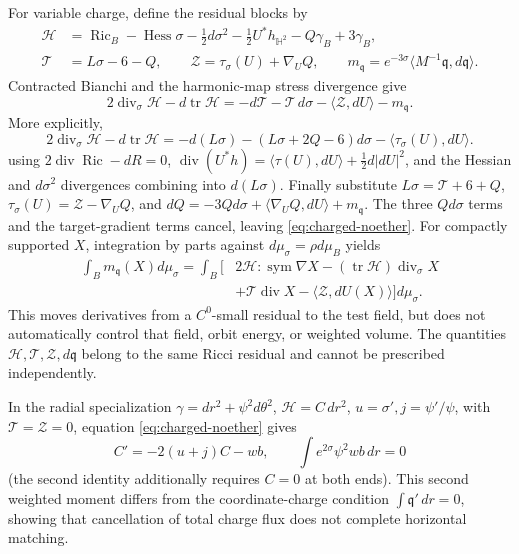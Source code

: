 \documentclass[a4paper,11pt]{article}
\numberwithin{equation}{section}
\theoremstyle{definition}
\newcommand{\Ric}{\operatorname{Ric}}
\newcommand{\tr}{\operatorname{tr}}
\begin{document}
For variable charge, define the residual blocks by
\begin{align}
 \mathscr H&=\Ric_B-\operatorname{Hess}\sigma
       -\tfrac12d\sigma^2-\tfrac12U^*h_{\mathbb H^2}-Q\gamma_B+3\gamma_B,\nonumber\\
 \mathscr T&=L\sigma-6-Q,\qquad
 \mathscr Z=\tau_\sigma(U)+\nabla_UQ,
 \qquad m_{\mathfrak q}=e^{-3\sigma}
          \langle M^{-1}\mathfrak q,d\mathfrak q\rangle.\label{eq:charged-blocks}
\end{align}
Contracted Bianchi and the harmonic-map stress divergence give
\begin{equation}\label{eq:charged-noether}
 2\operatorname{div}_\sigma\mathscr H-d\tr\mathscr H
 =-d\mathscr T-\mathscr T\,d\sigma
 -\langle\mathscr Z,dU\rangle-m_{\mathfrak q}.
\end{equation}
More explicitly,
\[
 2\operatorname{div}_\sigma\mathscr H-d\tr\mathscr H
 =-d(L\sigma)-(L\sigma+2Q-6)d\sigma
                  -\langle\tau_\sigma(U),dU\rangle.
\]
using $2\operatorname{div}\Ric-dR=0$,
$\operatorname{div}(U^*h)=\langle\tau(U),dU\rangle+\tfrac12d|dU|^2$,
and the Hessian and $d\sigma^2$ divergences combining into $d(L\sigma)$.
Finally substitute
$L\sigma=\mathscr T+6+Q$,
$\tau_\sigma(U)=\mathscr Z-\nabla_UQ$, and
$dQ=-3Qd\sigma+\langle\nabla_UQ,dU\rangle+m_{\mathfrak q}$.
The three $Qd\sigma$ terms and the target-gradient terms cancel, leaving \eqref{eq:charged-noether}.
For compactly supported $X$, integration by parts against $d\mu_\sigma=\rho d\mu_B$ yields
\begin{align}
 \int_Bm_{\mathfrak q}(X)d\mu_\sigma
 =\int_B\bigl[&2\mathscr H:\operatorname{sym}\nabla X
  -(\tr\mathscr H)\operatorname{div}_\sigma X\nonumber\\
 &+\mathscr T\operatorname{div}X
  -\langle\mathscr Z,dU(X)\rangle\bigr]d\mu_\sigma.\label{eq:charged-pairing}
\end{align}
This moves derivatives from a $C^0$-small residual to the test field, but does not automatically control that field, orbit energy, or weighted volume.
The quantities $\mathscr H,\mathscr T,\mathscr Z,d\mathfrak q$ belong to the same Ricci residual and cannot be prescribed independently.

In the radial specialization $\gamma=dr^2+\psi^2d\theta^2$, $\mathscr H=C\,dr^2$,
$u=\sigma',j=\psi'/\psi$, with $\mathscr T=\mathscr Z=0$, equation \eqref{eq:charged-noether} gives
\[
 C'=-2(u+j)C-wb,
 \qquad\int e^{2\sigma}\psi^2wb\,dr=0
\]
(the second identity additionally requires $C=0$ at both ends).
This second weighted moment differs from the coordinate-charge condition $\int\mathfrak q'\,dr=0$, showing that cancellation of total charge flux does not complete horizontal matching.
\end{document}
